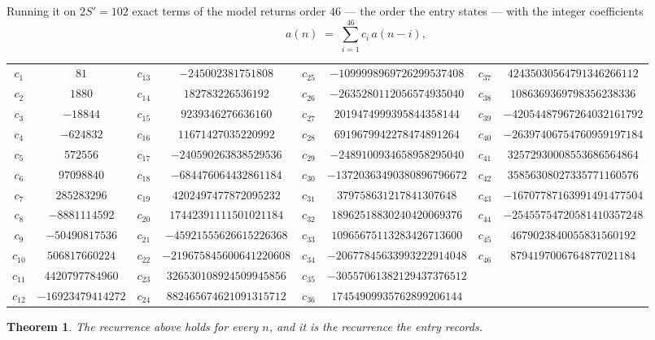 \documentclass[11pt,a4paper]{article}
\theoremstyle{plain}
\newtheorem{theorem}{Theorem}
\theoremstyle{definition}
\begin{document}
Running it on $2S'=102$ exact terms of the model returns order $46$ --- the order the
entry states --- with the integer coefficients
\[
a(n)\;=\;\sum_{i=1}^{46}c_i\,a(n-i),
\]
\begin{center}\small
\begin{tabular}{cccccccc}
$c_{1}$ & $81$ & $c_{13}$ & $-245002381751808$ & $c_{25}$ & $-1099998969726299537408$ & $c_{37}$ & $42435030564791346266112$ \\
$c_{2}$ & $1880$ & $c_{14}$ & $182783226536192$ & $c_{26}$ & $-2635280112056574935040$ & $c_{38}$ & $1086369369798356238336$ \\
$c_{3}$ & $-18844$ & $c_{15}$ & $9239346276636160$ & $c_{27}$ & $2019474999395844358144$ & $c_{39}$ & $-42054487967264032161792$ \\
$c_{4}$ & $-624832$ & $c_{16}$ & $11671427035220992$ & $c_{28}$ & $6919679942278474891264$ & $c_{40}$ & $-26397406754760959197184$ \\
$c_{5}$ & $572556$ & $c_{17}$ & $-240590263838529536$ & $c_{29}$ & $-2489100934658958295040$ & $c_{41}$ & $32572930008553686564864$ \\
$c_{6}$ & $97098840$ & $c_{18}$ & $-684476064432861184$ & $c_{30}$ & $-13720363490380896796672$ & $c_{42}$ & $35856308027335771160576$ \\
$c_{7}$ & $285283296$ & $c_{19}$ & $4202497477872095232$ & $c_{31}$ & $379758631217841307648$ & $c_{43}$ & $-16707787163991491477504$ \\
$c_{8}$ & $-8881114592$ & $c_{20}$ & $17442391111501021184$ & $c_{32}$ & $18962518830240420069376$ & $c_{44}$ & $-25455754720581410357248$ \\
$c_{9}$ & $-50490817536$ & $c_{21}$ & $-45921555626615226368$ & $c_{33}$ & $10965675113283426713600$ & $c_{45}$ & $4679023840055831560192$ \\
$c_{10}$ & $506817660224$ & $c_{22}$ & $-219675845600641220608$ & $c_{34}$ & $-20677845633993222914048$ & $c_{46}$ & $8794197006764877021184$ \\
$c_{11}$ & $4420797784960$ & $c_{23}$ & $326530108924509945856$ & $c_{35}$ & $-30557061382129437376512$ &  &  \\
$c_{12}$ & $-16923479414272$ & $c_{24}$ & $882465674621091315712$ & $c_{36}$ & $17454909935762899206144$ &  &  \\
\end{tabular}
\end{center}

\begin{theorem}
The recurrence above holds for every $n$, and it is the recurrence the entry records.
\end{theorem}
\end{document}
